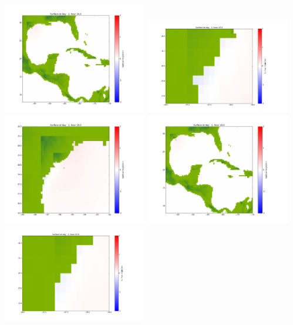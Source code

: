 \documentclass[11pt]{article}
\begin{document}
\vskip 10pt 
\includegraphics[width=0.475\textwidth]{frame0056fig1003.png}
\vskip 10pt 
\includegraphics[width=0.475\textwidth]{frame0057fig1001.png}
\includegraphics[width=0.475\textwidth]{frame0057fig1002.png}
\vskip 10pt 
\includegraphics[width=0.475\textwidth]{frame0057fig1003.png}
\vskip 10pt 
\includegraphics[width=0.475\textwidth]{frame0058fig1001.png}
\end{document}
